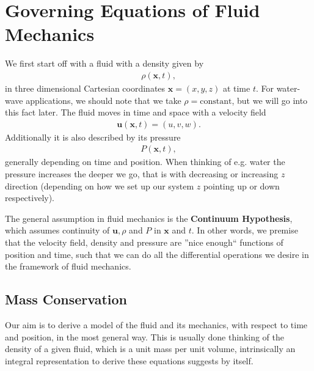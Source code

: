 \section{Governing Equations of Fluid Mechanics}
We first start off with a fluid with a density given by
\begin{align}
    \rho(\mathbf{x}, t),
\end{align}
in three dimensional Cartesian coordinates $\mathbf{x} = (x, y, z)$ at time
$t$. For water-wave applications, we should note that we take
$\rho=\text{constant}$, but we will go into this fact later. The fluid moves
in time and space with a velocity field
\begin{align}
    \mathbf{u}(\mathbf{x}, t) = (u, v, w).
\end{align}
Additionally it is also described by its pressure
\begin{align}
    P(\mathbf{x}, t),
\end{align}
generally depending on time and position. When thinking of e.g. water the
pressure increases the deeper we go, that is with decreasing or increasing $z$
direction (depending on how we set up our system $z$ pointing up or down
respectively).

The general assumption in fluid mechanics is the \textbf{Continuum
Hypothesis}, which assumes continuity of $\textbf{u}, \rho$ and $P$ in
$\mathbf{x}$ and $t$. In other words, we premise that the velocity field,
density and pressure are ''nice enough`` functions of position and time, such
that we can do all the differential operations we desire in the framework of
fluid mechanics.
\subsection{Mass Conservation}
Our aim is to derive a model of the fluid and its mechanics, with respect to
time and position, in the most general way. This is usually done thinking
of the density of a given fluid, which is a unit mass per unit volume,
intrinsically  an integral representation to derive these equations suggests
by itself.

